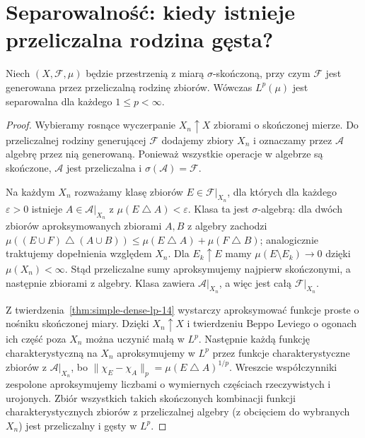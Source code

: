 \section{Separowalność: kiedy istnieje przeliczalna rodzina gęsta?}

\begin{twierdzenie}[Separowalność $L^p$]
\label{thm:separable-lp-14}
Niech $(X,\mathcal F,\mu)$ będzie przestrzenią
z miarą $\sigma$-skończoną, przy czym $\mathcal F$
jest generowana przez przeliczalną rodzinę zbiorów.
Wówczas $L^p(\mu)$ jest separowalna dla
każdego $1\le p<\infty$.
\end{twierdzenie}
\begin{proof}
Wybieramy rosnące wyczerpanie $X_n\uparrow X$
zbiorami o skończonej mierze. Do przeliczalnej
rodziny generującej $\mathcal F$ dodajemy zbiory $X_n$
i oznaczamy przez $\mathcal A$ algebrę przez nią generowaną.
Ponieważ wszystkie operacje w algebrze są skończone,
$\mathcal A$ jest przeliczalna i $\sigma(\mathcal A)=\mathcal F$.

Na każdym $X_n$ rozważamy klasę zbiorów $E\in\mathcal F|_{X_n}$,
dla których dla każdego $\varepsilon>0$ istnieje
$A\in\mathcal A|_{X_n}$ z
$\mu(E\mathbin\triangle A)<\varepsilon$.
Klasa ta jest $\sigma$-algebrą: dla dwóch zbiorów
aproksymowanych zbiorami $A,B$ z algebry zachodzi
$\mu((E\cup F)\mathbin\triangle(A\cup B))\le
\mu(E\mathbin\triangle A)+\mu(F\mathbin\triangle B)$;
analogicznie traktujemy dopełnienia względem $X_n$.
Dla $E_k\uparrow E$ mamy
$\mu(E\setminus E_k)\to0$ dzięki
$\mu(X_n)<\infty$. Stąd przeliczalne sumy
aproksymujemy najpierw skończonymi, a następnie
zbiorami z algebry. Klasa zawiera $\mathcal A|_{X_n}$,
a więc jest całą $\mathcal F|_{X_n}$.

Z twierdzenia~\ref{thm:simple-dense-lp-14}
wystarczy aproksymować funkcje proste o nośniku
skończonej miary. Dzięki $X_n\uparrow X$ i twierdzeniu
Beppo Leviego o ogonach ich część poza $X_n$
można uczynić małą w $L^p$. Następnie każdą
funkcję charakterystyczną na $X_n$ aproksymujemy
w $L^p$ przez funkcje charakterystyczne zbiorów z
$\mathcal A|_{X_n}$, bo
$\|\chi_E-\chi_A\|_p
=\mu(E\mathbin\triangle A)^{1/p}$.
Wreszcie współczynniki zespolone aproksymujemy
liczbami o wymiernych częściach rzeczywistych
i urojonych. Zbiór wszystkich takich skończonych
kombinacji funkcji charakterystycznych zbiorów z przeliczalnej
algebry (z obcięciem do wybranych $X_n$) jest
przeliczalny i gęsty w $L^p$.
\end{proof}

